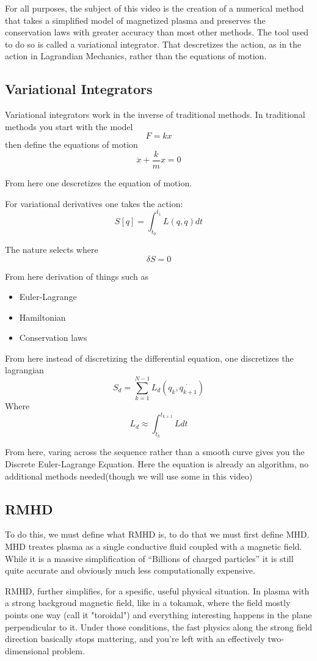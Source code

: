 For all purposes, the subject of this video is the creation of a numerical method that takes a simplified model of magnetized plasma and preserves the conservation laws with greater accuracy than most other methods. The tool used to do so is called a variational integrator. That descretizes the action, as in the action in Lagrandian Mechanics, rather than the equations of motion.
\subsection{Variational Integrators}
Variational integrators work in the inverse of traditional methods. In traditional methods you start with the model
\[
F = kx
\]
then define the equations of motion
\[
\ddot{x} + \frac{k}{m}x = 0
  \]

  From here one descretizes the equation of motion.

  For variational derivatives one takes the action:
\[
S[q] = \int_{t_0}^{t_1} L(q, \dot{q}) dt
  \]

  The nature selects where
\[
  \delta S = 0
  \]

  From here derivation of things such as
  \begin{itemize}
    \item Euler-Lagrange
    \item Hamiltonian
    \item Conservation laws
  \end{itemize}
  From here instead of discretizing the differential equation, one discretizes the lagrangian
\[
S_d = \sum_{k=1}^{N-1} L_d(q_k, \dot{q_{k+1}})
  \]
  Where
\[
L_d \approx \int_{t_k}^{t_{k+1}}L dt
  \]

  From here, varing across the sequence rather than a smooth curve gives you the Discrete Euler-Lagrange Equation. Here the equation is already an algorithm, no additional methods needed(though we will use some in this video)
\subsection{RMHD}

To do this, we must define what RMHD is, to do that we must first define MHD. MHD treates plasma as a single conductive fluid coupled with a magnetic field. While it is a massive simplification of ``Billions of charged particles'' it is still quite accurate and obviously much less computationally expensive.

RMHD, further simplifies, for a spesific, useful physical situation. In plasma with a strong backgroud magnetic field, like in a tokamak, where the field mostly points one way (call it "toroidal") and everything interesting happens in the plane perpendicular to it. Under those conditions, the fast physics along the strong field direction basically stops mattering, and you're left with an effectively two-dimensional problem.

